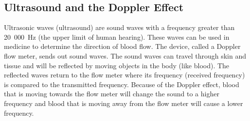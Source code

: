 \subsection{Ultrasound and the Doppler Effect}
Ultrasonic waves (ultrasound) are sound waves with a frequency greater than 20~000~Hz (the upper limit of human hearing). These waves can be used in medicine to determine the direction of blood flow. The device, called a Doppler flow meter, sends out sound waves. The sound waves can travel through skin and tissue and will be reflected by moving objects in the body (like blood). The reflected waves return to the flow meter where its frequency (received frequency) is compared to the transmitted frequency.
Because of the Doppler effect, blood that is moving towards the flow meter will change the sound to a higher frequency and blood that is moving away from the flow meter will cause a lower frequency.
